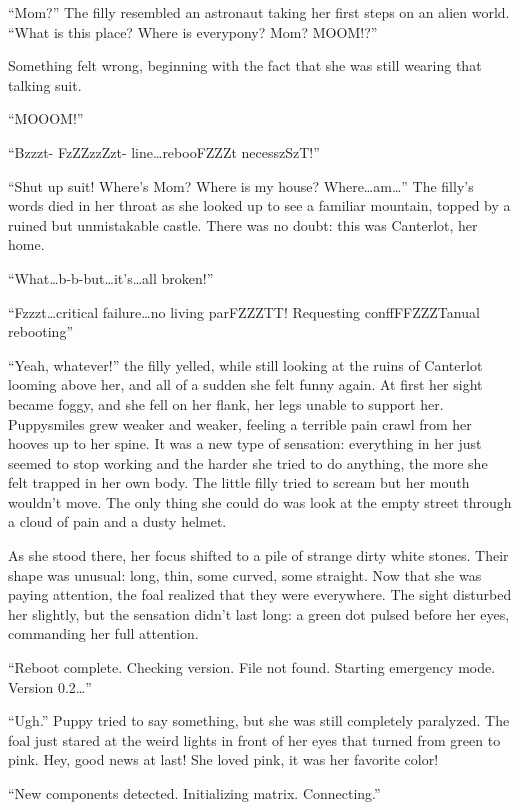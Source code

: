 ``Mom?'' The filly resembled an astronaut taking her first steps on an alien world. ``What is this place? Where is everypony? Mom? MOOM!?''

Something felt wrong, beginning with the fact that she was still wearing that talking suit.

``MOOOM!''

``{\mt Bzzzt- FzZZzzZzt- line\dots rebooFZZZt necesszSzT!}''

``Shut up suit! Where's Mom? Where is my house? Where\dots am\dots'' The filly's words died in her throat as she looked up to see a familiar mountain, topped by a ruined but unmistakable castle. There was no doubt: this was Canterlot, her home.

``What\dots b-b-but\dots it's\dots all broken!''

``{\mt Fzzzt\dots critical failure\dots no living parFZZZTT! Requesting conffFFZZZTanual rebooting}''

``Yeah, whatever!'' the filly yelled, while still looking at the ruins of Canterlot looming above her, and all of a sudden she felt funny again. At first her sight became foggy, and she fell on her flank, her legs unable to support her. Puppysmiles grew weaker and weaker, feeling a terrible pain crawl from her hooves up to her spine. It was a new type of sensation: everything in her just seemed to stop working and the harder she tried to do anything, the more she felt trapped in her own body. The little filly tried to scream but her mouth wouldn't move. The only thing she could do was look at the empty street through a cloud of pain and a dusty helmet.

As she stood there, her focus shifted to a pile of strange dirty white stones. Their shape was unusual: long, thin, some curved, some straight. Now that she was paying attention, the foal realized that they were everywhere. The sight disturbed her slightly, but the sensation didn't last long: a green dot pulsed before her eyes, commanding her full attention.

``{\mt Reboot complete. Checking version. File not found. Starting emergency mode. Version 0.2\dots}''

``Ugh.'' Puppy tried to say something, but she was still completely paralyzed. The foal just stared at the weird lights in front of her eyes that turned from green to pink. Hey, good news at last! She loved pink, it was her favorite color!

``{\mt New components detected. Initializing matrix. Connecting.}''

